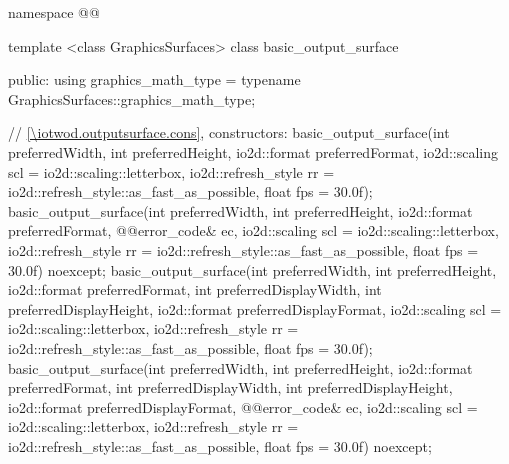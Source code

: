 \begin{codeblock}
namespace @\fullnamespace{}@ {
  template <class GraphicsSurfaces>
  class basic_output_surface {
  public:
    using graphics_math_type = typename GraphicsSurfaces::graphics_math_type;

    // \ref{\iotwod.outputsurface.cons}, constructors:
    basic_output_surface(int preferredWidth, int preferredHeight,
      io2d::format preferredFormat,
      io2d::scaling scl = io2d::scaling::letterbox,
      io2d::refresh_style rr = io2d::refresh_style::as_fast_as_possible,
      float fps = 30.0f);
    basic_output_surface(int preferredWidth, int preferredHeight,
      io2d::format preferredFormat,
      @\stdqualifier{}@error_code& ec, io2d::scaling scl = io2d::scaling::letterbox,
      io2d::refresh_style rr = io2d::refresh_style::as_fast_as_possible,
      float fps = 30.0f) noexcept;
    basic_output_surface(int preferredWidth, int preferredHeight,
      io2d::format preferredFormat, int preferredDisplayWidth,
      int preferredDisplayHeight, io2d::format preferredDisplayFormat,
      io2d::scaling scl = io2d::scaling::letterbox,
      io2d::refresh_style rr = io2d::refresh_style::as_fast_as_possible,
      float fps = 30.0f);
    basic_output_surface(int preferredWidth, int preferredHeight,
      io2d::format preferredFormat, int preferredDisplayWidth,
      int preferredDisplayHeight, io2d::format preferredDisplayFormat,
      @\stdqualifier{}@error_code& ec, io2d::scaling scl = io2d::scaling::letterbox,
      io2d::refresh_style rr = io2d::refresh_style::as_fast_as_possible,
      float fps = 30.0f) noexcept;

}}
\end{codeblock}
